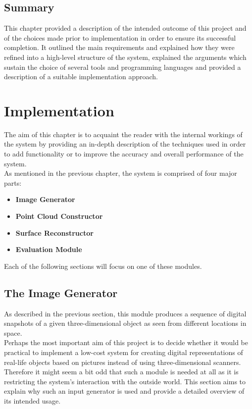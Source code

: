 \documentclass[12pt,a4paper,twoside,openright]{report}
\begin{document}
\section{Summary}
This chapter provided a description of the intended outcome of this project and of the choices made prior to implementation in order to ensure its successful completion. It outlined the main requirements and explained how they were refined into a high-level structure of the system, explained the arguments which sustain the choice of several tools and programming languages and provided a description of a suitable implementation approach.
\chapter{Implementation}

The aim of this chapter is to acquaint the reader with the internal workings of the system by providing an in-depth description of the techniques used in order to add functionality or to improve the accuracy and overall performance of the system.\\
\linebreak
As mentioned in the previous chapter, the system is comprised of four major parts:
\begin{itemize}
\item \textbf{Image Generator}
\item \textbf{Point Cloud Constructor} 
\item \textbf{Surface Reconstructor}
\item \textbf{Evaluation Module}
\end{itemize}
Each of the following sections will focus on one of these modules. 


\section{The Image Generator}
As described in the previous section, this module produces a sequence of digital snapshots of a given three-dimensional object as seen from different locations in space. \\
Perhaps the most important aim of this project is to decide whether it would be practical to implement a low-cost system for creating digital representations of real-life objects based on pictures instead of using three-dimensional scanners. Therefore it might seem a bit odd that such a module is needed at all as it is restricting the system's interaction with the outside world. This section aims to explain why such an input generator is used and provide a detailed overview of its intended usage. 
\end{document}
